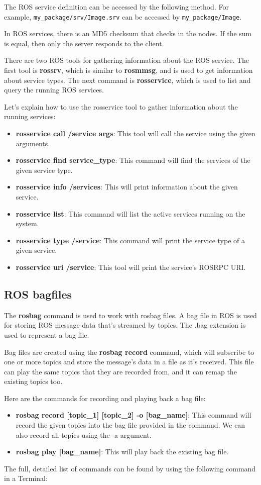 \documentclass[../../main]{subfiles}
\begin{document}
The ROS service definition can be accessed by the following method. For example, \texttt{my\_package/srv/Image.srv} can be accessed by \texttt{my\_package/Image}.

In ROS services, there is an MD5 checksum that checks in the nodes. If the sum is equal, then only the server responds to the client.

There are two ROS tools for gathering information about the ROS service. The first tool is \textbf{rossrv}, which is similar to \textbf{rosmmsg}, and is used to get information about service types. The next command is \textbf{rosservice}, which is used to list and query the running ROS services.

Let's explain how to use the rosservice tool to gather information about the running services:
\begin{itemize}
    \item \textbf{rosservice call /service args}: This tool will call the service using the given arguments.
    \item \textbf{rosservice find service\_type}: This command will find the services of the given service type.
    \item \textbf{rosservice info /services}: This will print information about the given service.
    \item \textbf{rosservice list}: This command will list the active services running on the system.
    \item \textbf{rosservice type /service}: This command will print the service type of a given service.
    \item \textbf{rosservice uri /service}: This tool will print the service's ROSRPC URI.
\end{itemize}

\subsection{ROS bagfiles}

The \textbf{rosbag} command is used to work with rosbag files. A bag file in ROS is used for storing ROS message data that's streamed by topics. The .bag extension is used to represent a bag file.

Bag files are created using the \textbf{rosbag record} command, which will subscribe to one or more topics and store the message's data in a file as it's received. This file can play the same topics that they are recorded from, and it can remap the existing topics too.

Here are the commands for recording and playing back a bag file:
\begin{itemize}
    \item \textbf{rosbag record [topic\_1] [topic\_2] -o [bag\_name]}: This command will record the given topics into the bag file provided in the command. We can also record all topics using the -a argument.
    \item \textbf{rosbag play [bag\_name]}: This will play back the existing bag file.
\end{itemize}
The full, detailed list of commands can be found by using the following command in a
Terminal:
\end{document}
